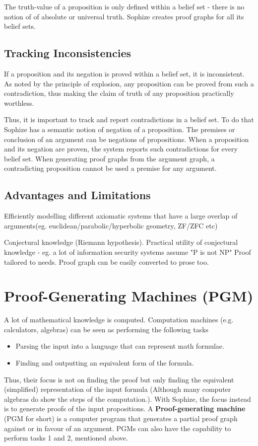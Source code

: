 \documentclass[a4paper]{article}
\begin{document}
The truth-value of a proposition is only defined within a belief set - there is no notion of of absolute or universal truth. Sophize creates proof graphs for all its belief sets.

\subsection{Tracking Inconsistencies}
If a proposition and its negation is proved within a belief set, it is inconsistent. As noted by the principle of explosion, any proposition can be proved from such a contradiction, thus making the claim of truth of any proposition practically worthless.

Thus, it is important to track and report contradictions in a belief set. To do that Sophize has a semantic notion of negation of a proposition. The premises or conclusion of an argument can be negations of propositions. When a proposition and its negation are proven, the system reports such contradictions for every belief set. When generating proof graphs from the argument graph, a contradicting proposition cannot be used a premise for any argument.

\subsection{Advantages and Limitations}

Efficiently modelling different axiomatic systems that have a large overlap of arguments(eg. euclidean/parabolic/hyperbolic geometry, ZF/ZFC etc)

Conjectural knowledge (Riemann hypothesis). 
Practical utility of conjectural knowledge - eg. a lot of information security systems assume "P is not NP"
Proof tailored to needs. Proof graph can be easily converted to prose too.

\section{Proof-Generating Machines (PGM)}
\label{sec:pgm}
A lot of mathematical knowledge is computed. Computation machines (e.g. calculators, algebras) can be seen as performing the following tasks
\begin{itemize}
\item Parsing the input into a language that can represent math formulae. 
\item Finding and outputting an equivalent form of the formula.
\end{itemize}
Thus, their focus is not on finding the proof but only finding the equivalent (simplified) representation of the input formula (Although many computer algebras do show the steps of the computation.). With Sophize, the focus instead is to generate proofs of the input propositions. A \textbf{Proof-generating machine} (PGM for short) is a computer program that generates a partial proof graph against or in favour of an argument. PGMs can also have the capability to perform tasks 1 and 2, mentioned above.
\end{document}
